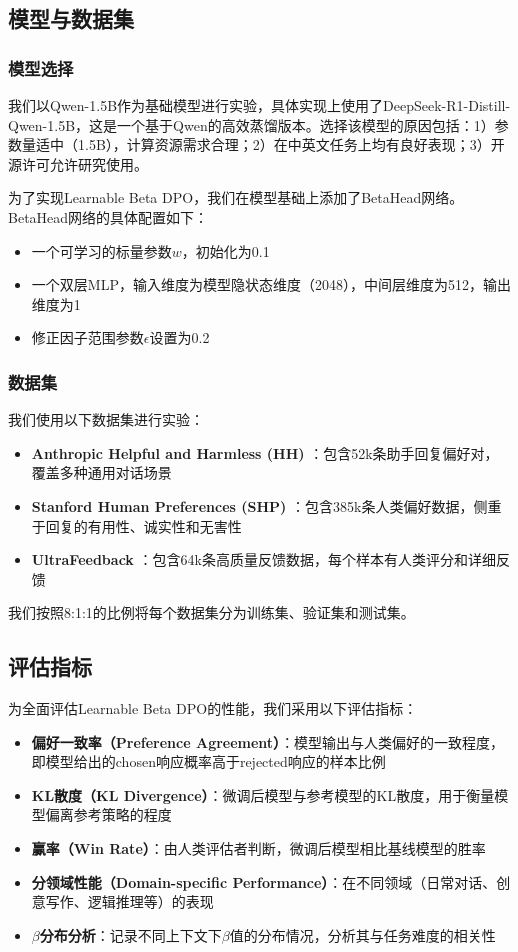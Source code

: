 \subsection{模型与数据集}
\subsubsection{模型选择}
我们以Qwen-1.5B作为基础模型进行实验，具体实现上使用了DeepSeek-R1-Distill-Qwen-1.5B，这是一个基于Qwen的高效蒸馏版本。选择该模型的原因包括：1）参数量适中（1.5B），计算资源需求合理；2）在中英文任务上均有良好表现；3）开源许可允许研究使用。

为了实现Learnable Beta DPO，我们在模型基础上添加了BetaHead网络。BetaHead网络的具体配置如下：
\begin{itemize}
    \item 一个可学习的标量参数$w$，初始化为0.1
    \item 一个双层MLP，输入维度为模型隐状态维度（2048），中间层维度为512，输出维度为1
    \item 修正因子范围参数$\epsilon$设置为0.2
\end{itemize}

\subsubsection{数据集}
我们使用以下数据集进行实验：

\begin{itemize}
    \item \textbf{Anthropic Helpful and Harmless (HH)} \cite{bai2022training}：包含52k条助手回复偏好对，覆盖多种通用对话场景
    \item \textbf{Stanford Human Preferences (SHP)} \cite{pmlr-v162-ethayarajh22a}：包含385k条人类偏好数据，侧重于回复的有用性、诚实性和无害性
    \item \textbf{UltraFeedback} \cite{cui2023ultrafeedback}：包含64k条高质量反馈数据，每个样本有人类评分和详细反馈
\end{itemize}

我们按照8:1:1的比例将每个数据集分为训练集、验证集和测试集。

\subsection{评估指标}
为全面评估Learnable Beta DPO的性能，我们采用以下评估指标：

\begin{itemize}
    \item \textbf{偏好一致率（Preference Agreement）}：模型输出与人类偏好的一致程度，即模型给出的chosen响应概率高于rejected响应的样本比例
    \item \textbf{KL散度（KL Divergence）}：微调后模型与参考模型的KL散度，用于衡量模型偏离参考策略的程度
    \item \textbf{赢率（Win Rate）}：由人类评估者判断，微调后模型相比基线模型的胜率
    \item \textbf{分领域性能（Domain-specific Performance）}：在不同领域（日常对话、创意写作、逻辑推理等）的表现
    \item \textbf{$\beta$分布分析}：记录不同上下文下$\beta$值的分布情况，分析其与任务难度的相关性
\end{itemize}

